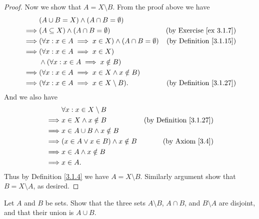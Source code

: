 \begin{proof}
    Now we show that \(A = X \setminus B\).
    From the proof above we have
    \begin{align*}
                 & (A \cup B = X) \land (A \cap B = \emptyset)                                                               \\
        \implies & (A \subseteq X) \land (A \cap B = \emptyset)                        & \text{(by Exercise \ref{ex 3.1.7})} \\
        \implies & (\forall x : x \in A \implies x \in X) \land (A \cap B = \emptyset) & \text{(by Definition \ref{3.1.15})} \\
        \implies & (\forall x : x \in A \implies x \in X)                                                                    \\
                 & \land (\forall x : x \in A \implies x \notin B)                                                           \\
        \implies & (\forall x : x \in A \implies x \in X \land x \notin B)                                                   \\
        \implies & (\forall x : x \in A \implies x \in X \setminus B).                 & \text{(by Definition \ref{3.1.27})}
    \end{align*}
    And we also have
    \begin{align*}
                 & \forall x : x \in X \setminus B                                               \\
        \implies & x \in X \land x \notin B                & \text{(by Definition \ref{3.1.27})} \\
        \implies & x \in A \cup B \land x \notin B                                               \\
        \implies & (x \in A \lor x \in B) \land x \notin B & \text{(by Axiom \ref{3.4})}         \\
        \implies & x \in A \land x \notin B                                                      \\
        \implies & x \in A.
    \end{align*}
    Thus by Definition \ref{3.1.4} we have \(A = X \setminus B\).
    Similarly argument show that \(B = X \setminus A\), as desired.
\end{proof}

\begin{exercise}\label{ex 3.1.10}
    Let \(A\) and \(B\) be sets.
    Show that the three sets \(A \setminus B\), \(A \cap B\), and \(B \setminus A\) are disjoint, and that their union is \(A \cup B\).
\end{exercise}

